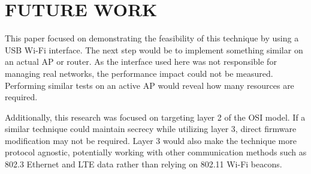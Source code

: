 \documentclass[letterpaper, 10 pt, conference]{ieeeconf}  %
\begin{document}
\section{FUTURE WORK}

This paper focused on demonstrating the feasibility of this technique by using a USB Wi-Fi interface.  The next step would be to implement something similar on an actual AP or router. As the interface used here was not responsible for managing real networks, the performance impact could not be measured.  Performing similar tests on an active AP would reveal how many resources are required.

Additionally, this research was focused on targeting layer 2 of the OSI model.  If a similar technique could maintain secrecy while utilizing layer 3, direct firmware modification may not be required.  Layer 3 would also make the technique more protocol agnostic, potentially working with other communication methods such as 802.3 Ethernet and LTE data rather than relying on 802.11 Wi-Fi beacons.






\end{document}
